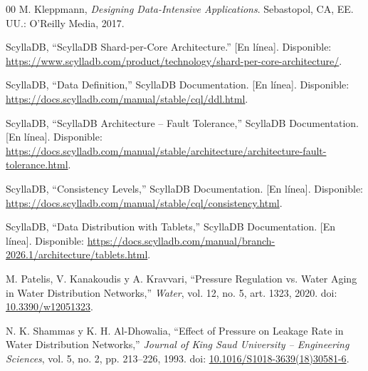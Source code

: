 \documentclass[conference]{IEEEtran}
\begin{document}
\begin{thebibliography}{00}
 M. Kleppmann, \emph{Designing Data-Intensive Applications}. Sebastopol, CA, EE. UU.: O'Reilly Media, 2017.

ScyllaDB,
``ScyllaDB Shard-per-Core Architecture.''
[En línea]. Disponible:
\url{https://www.scylladb.com/product/technology/shard-per-core-architecture/}.

ScyllaDB,
``Data Definition,'' ScyllaDB Documentation.
[En línea]. Disponible:
\url{https://docs.scylladb.com/manual/stable/cql/ddl.html}.

ScyllaDB,
``ScyllaDB Architecture -- Fault Tolerance,''
ScyllaDB Documentation.
[En línea]. Disponible:
\url{https://docs.scylladb.com/manual/stable/architecture/architecture-fault-tolerance.html}.

ScyllaDB,
``Consistency Levels,'' ScyllaDB Documentation.
[En línea]. Disponible:
\url{https://docs.scylladb.com/manual/stable/cql/consistency.html}.

ScyllaDB,
``Data Distribution with Tablets,'' ScyllaDB Documentation.
[En línea]. Disponible:
\url{https://docs.scylladb.com/manual/branch-2026.1/architecture/tablets.html}.

M. Patelis, V. Kanakoudis y A. Kravvari,
``Pressure Regulation vs. Water Aging in Water
Distribution Networks,''
\textit{Water}, vol. 12, no. 5, art. 1323, 2020.
doi: \href{https://doi.org/10.3390/w12051323}
{10.3390/w12051323}.

N. K. Shammas y K. H. Al-Dhowalia,
``Effect of Pressure on Leakage Rate in Water
Distribution Networks,''
\textit{Journal of King Saud University --
Engineering Sciences},
vol. 5, no. 2, pp. 213--226, 1993.
doi: \href{https://doi.org/10.1016/S1018-3639(18)30581-6}
{10.1016/S1018-3639(18)30581-6}.

\end{thebibliography}
\end{document}
